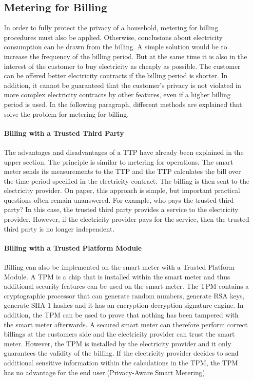 \subsection{Metering for Billing}
In order to fully protect the privacy of a household, metering for billing procedures must also be applied. Otherwise, conclusions about electricity consumption can be drawn from the billing. A simple solution would be to increase the frequency of the billing period. But at the same time it is also in the interest of the customer to buy electricity as cheaply as possible. The customer can be offered better electricity contracts if the billing period is shorter. In addition, it cannot be guaranteed that the customer's privacy is not violated in more complex electricity contracts by other features, even if a higher billing period is used. In the following paragraph, different methods are explained that solve the problem for metering for billing.\\
\\
\textbf{Billing with a Trusted Third Party}
\\
\\
The advantages and disadvantages of a TTP have already been explained in the upper section. The principle is similar to metering for operations. The smart meter sends its measurements to the TTP and the TTP calculates the bill over the time period specified in the electricity contract. The billing is then sent to the electricity provider. On paper, this approach is simple, but important practical questions often remain unanswered. For example, who pays the trusted third party? In this case, the trusted third party provides a service to the electricity provider. However, if the electricity provider pays for the service, then the trusted third party is no longer independent.\\
\\
\textbf{Billing with a Trusted Platform Module}
\\
\\
Billing can also be implemented on the smart meter with a Trusted Platform Module. A TPM is a chip that is installed within the smart meter and thus additional security features can be used on the smart meter. The TPM contains a cryptographic processor that can generate random numbers, generate RSA keys, generate SHA-1 hashes and it has
an encryption-decryption-signature engine. In addition, the TPM can be used to prove that nothing has been tampered with the smart meter afterwards. A secured smart meter can therefore perform correct billings at the customers side and the electricity provider can trust the smart meter. However, the TPM is installed by the electricity provider and it only guarantees the validity of the billing. If the electricity provider decides to send additional sensitive information within the calculations in the TPM, the TPM has no advantage for the end user.(Privacy-Aware Smart Metering)\\
